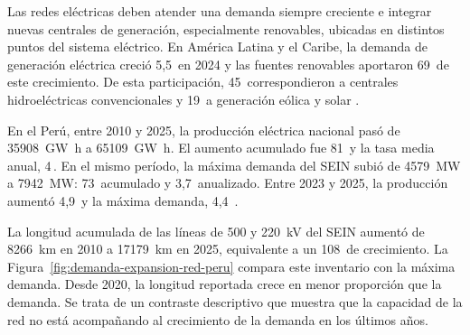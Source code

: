 Las redes eléctricas deben atender una demanda siempre creciente e integrar nuevas centrales de generación, especialmente renovables, ubicadas en distintos puntos del sistema eléctrico. En América Latina y el Caribe, la demanda de generación eléctrica creció 5,5\,\pct{} en 2024 y las fuentes renovables aportaron 69\,\pct{} de este crecimiento. De esta participación, 45\,\pct{} correspondieron a centrales hidroeléctricas convencionales y 19\,\pct{} a generación eólica y solar \parencite{olade2025generacionALC2024}.

En el Perú, entre 2010 y 2025, la producción eléctrica nacional pasó de \SI{35908}{\giga\watt\hour} a \SI{65109}{\giga\watt\hour}. El aumento acumulado fue 81\,\pct{} y la tasa media anual, 4\,\pct{}. En el mismo período, la máxima demanda del SEIN subió de \SI{4579}{\mega\watt} a \SI{7942}{\mega\watt}: 73\,\pct{} acumulado y 3,7\,\pct{} anualizado. Entre 2023 y 2025, la producción aumentó 4,9\,\pct{} y la máxima demanda, 4,4\,\pct{} \parencites[sec.~10.4]{minem2025anuario2024}[cuadro~4]{minem2025indicadoresDiciembre}{coesMaximaDemanda}.

La longitud acumulada de las líneas de 500 y \SI{220}{\kilo\volt} del SEIN aumentó de \SI{8266}{\kilo\metre} en 2010 a \SI{17179}{\kilo\metre} en 2025, equivalente a un 108\,\pct{} de crecimiento. La Figura~\ref{fig:demanda-expansion-red-peru} compara este inventario con la máxima demanda. Desde 2020, la longitud reportada crece en menor proporción que la demanda. Se trata de un contraste descriptivo que muestra que  la capacidad de la red no está acompañando al crecimiento de la demanda en los últimos años\parencites{coesEstadisticasAnuales}{coesMaximaDemanda}.

